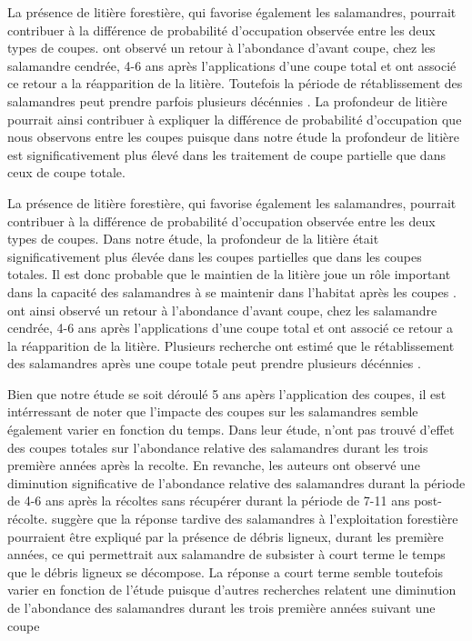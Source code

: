 La présence de litière forestière, qui favorise également les salamandres, pourrait contribuer à la différence de probabilité d'occupation observée entre les deux types de coupes. 
\cite{Ash1997DisappearanceReturn} ont observé un retour à l'abondance d'avant coupe, chez les salamandre cendrée, 4-6 ans après l'applications d'une coupe total et ont associé ce retour a la réapparition de la litière. 
Toutefois la période de rétablissement des salamandres peut prendre parfois plusieurs décénnies \citep{Homyack2013Effectsrepeatedstand,Ochs2022Responseterrestrial}. 
La profondeur de litière pourrait ainsi contribuer à expliquer la différence de probabilité d'occupation que nous observons entre les coupes puisque dans notre étude la profondeur de litière est significativement plus élevé dans les traitement de coupe partielle que dans ceux de coupe totale.

La présence de litière forestière, qui favorise également les salamandres, pourrait contribuer à la différence de probabilité d'occupation observée entre les deux types de coupes. 
Dans notre étude, la profondeur de la litière était significativement plus élevée dans les coupes partielles que dans les coupes totales. 
Il est donc probable que le maintien de la litière joue un rôle important dans la capacité des salamandres à se maintenir dans l'habitat après les coupes \citep{Tilghman2012Metaanalysiseffects}.
\cite{Ash1997DisappearanceReturn} ont ainsi observé un retour à l'abondance d'avant coupe, chez les salamandre cendrée, 4-6 ans après l'applications d'une coupe total et ont associé ce retour a la réapparition de la litière. 
Plusieurs recherche ont estimé que le rétablissement des salamandres après une coupe totale peut prendre plusieurs décénnies \citep{Homyack2013Effectsrepeatedstand,Ochs2022Responseterrestrial}. 





Bien que notre étude se soit déroulé 5 ans apèrs l'application des coupes, il est intérressant de noter que l'impacte des coupes sur les salamandres semble également varier en fonction du temps.
Dans leur étude, \cite{Ochs2022Responseterrestrial} n'ont pas trouvé d'effet des coupes totales sur l'abondance relative des salamandres durant les trois première années après la recolte.
En revanche, les auteurs ont observé une diminution significative de l'abondance relative des salamandres durant la période de 4-6 ans après la récoltes sans récupérer durant la période de 7-11 ans post-récolte.
\cite{Ochs2022Responseterrestrial} suggère que la réponse tardive des salamandres à l'exploitation forestière pourraient être expliqué par la présence de débris ligneux, durant les première années, ce qui permettrait aux salamandre de subsister à court terme le temps que le débris ligneux se décompose. 
La réponse a court terme semble toutefois varier en fonction de l'étude puisque d'autres recherches relatent une diminution de l'abondance des salamandres durant les trois première années suivant une coupe \citep{deMaynadier1995relationshipforest,Macneil2014Effectstimber}

